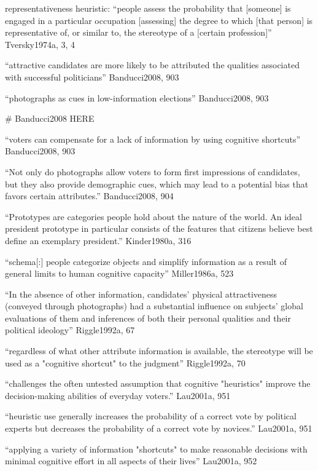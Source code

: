 representativeness heuristic: ``people assess the probability that [someone] is engaged in a particular occupation [assessing] the degree to which [that person] is representative of, or similar to, the stereotype of a [certain profession]'' Tversky1974a, 3, 4

``attractive candidates are more likely to be attributed the qualities associated with successful politicians'' Banducci2008, 903

``photographs as cues in low-information elections'' Banducci2008, 903

# Banducci2008 HERE

``voters can compensate for a lack of information by using cognitive shortcuts'' Banducci2008, 903

``Not only do photographs allow voters to form first impressions of candidates, but they also provide demographic cues, which may lead to a potential bias that favors certain attributes.'' Banducci2008, 904

``Prototypes are categories people hold about the nature of the world. An ideal president prototype in particular consists of the features that citizens believe best define an exemplary president.'' Kinder1980a, 316

``schema[:] people categorize objects and simplify information as a result of general limits to human cognitive capacity'' Miller1986a, 523

``In the absence of other information, candidates' physical attractiveness (conveyed through photographs) had a substantial influence on subjects' global evaluations of them and inferences of both their personal qualities and their political ideology'' Riggle1992a, 67

``regardless of what other attribute information is available, the stereotype will be used as a "cognitive shortcut" to the judgment'' Riggle1992a, 70

``challenges the often untested assumption that cognitive "heuristics" improve the decision-making abilities of everyday voters.'' Lau2001a, 951

``heuristic use generally increases the probability of a correct vote by political experts but decreases the probability of a correct vote by novices.'' Lau2001a, 951

``applying a variety of information "shortcuts" to make reasonable decisions with minimal cognitive effort in all aspects of their lives'' Lau2001a, 952



